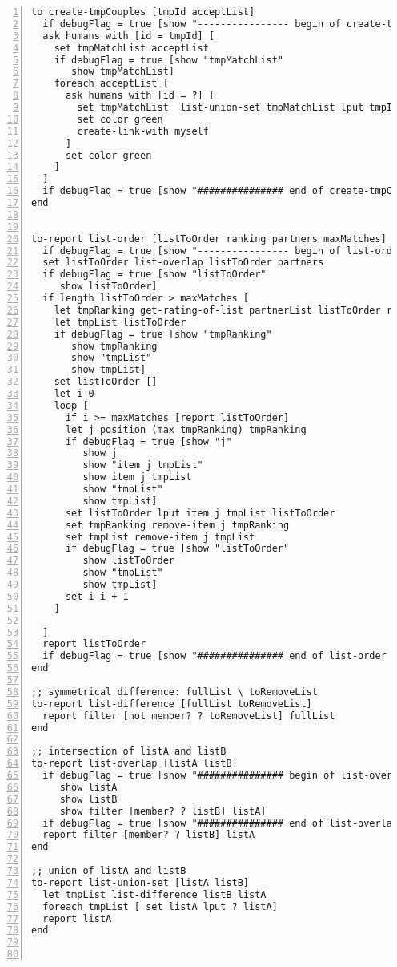 \begin{lstlisting}[numbers=left, breaklines=true]
to create-tmpCouples [tmpId acceptList]
  if debugFlag = true [show "---------------- begin of create-tmpCouples ----------------"]
  ask humans with [id = tmpId] [
    set tmpMatchList acceptList
    if debugFlag = true [show "tmpMatchList"
       show tmpMatchList]
    foreach acceptList [
      ask humans with [id = ?] [
        set tmpMatchList  list-union-set tmpMatchList lput tmpId []
        set color green
        create-link-with myself
      ]
      set color green
    ]
  ]
  if debugFlag = true [show "############### end of create-tmpCouples ###############"]
end


to-report list-order [listToOrder ranking partners maxMatches]
  if debugFlag = true [show "---------------- begin of list-order ----------------"]
  set listToOrder list-overlap listToOrder partners
  if debugFlag = true [show "listToOrder"
     show listToOrder]
  if length listToOrder > maxMatches [
    let tmpRanking get-rating-of-list partnerList listToOrder ranking
    let tmpList listToOrder
    if debugFlag = true [show "tmpRanking"
       show tmpRanking
       show "tmpList"
       show tmpList]
    set listToOrder []
    let i 0
    loop [
      if i >= maxMatches [report listToOrder]
      let j position (max tmpRanking) tmpRanking
      if debugFlag = true [show "j"
         show j
         show "item j tmpList"
         show item j tmpList
         show "tmpList"
         show tmpList]
      set listToOrder lput item j tmpList listToOrder
      set tmpRanking remove-item j tmpRanking
      set tmpList remove-item j tmpList
      if debugFlag = true [show "listToOrder"
         show listToOrder
         show "tmpList"
         show tmpList]
      set i i + 1
    ]

  ]
  report listToOrder
  if debugFlag = true [show "############### end of list-order ###############"]
end

;; symmetrical difference: fullList \ toRemoveList
to-report list-difference [fullList toRemoveList]
  report filter [not member? ? toRemoveList] fullList
end

;; intersection of listA and listB
to-report list-overlap [listA listB]
  if debugFlag = true [show "############### begin of list-overlap  ###############"
     show listA
     show listB
     show filter [member? ? listB] listA]
  if debugFlag = true [show "############### end of list-overlap  ###############"]
  report filter [member? ? listB] listA
end

;; union of listA and listB
to-report list-union-set [listA listB]
  let tmpList list-difference listB listA
  foreach tmpList [ set listA lput ? listA]
  report listA
end



\end{lstlisting}

